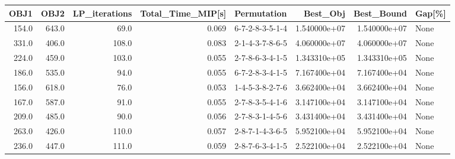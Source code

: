 \begin{tabular}{rrrrlrrl}
\toprule
  OBJ1 &   OBJ2 &  LP\_iterations &  Total\_Time\_MIP[s] &      Permutation &      Best\_Obj &    Best\_Bound & Gap[\%] \\
\midrule
 154.0 &  643.0 &           69.0 &              0.069 &  6-7-2-8-3-5-1-4 &  1.540000e+07 &  1.540000e+07 &   None \\
 331.0 &  406.0 &          108.0 &              0.083 &  2-1-4-3-7-8-6-5 &  4.060000e+07 &  4.060000e+07 &   None \\
 224.0 &  459.0 &          103.0 &              0.055 &  2-7-8-6-3-4-1-5 &  1.343310e+05 &  1.343310e+05 &   None \\
 186.0 &  535.0 &           94.0 &              0.055 &  6-7-2-8-3-4-1-5 &  7.167400e+04 &  7.167400e+04 &   None \\
 156.0 &  618.0 &           76.0 &              0.053 &  1-4-5-3-8-2-7-6 &  3.662400e+04 &  3.662400e+04 &   None \\
 167.0 &  587.0 &           91.0 &              0.055 &  2-7-8-3-5-4-1-6 &  3.147100e+04 &  3.147100e+04 &   None \\
 209.0 &  485.0 &           90.0 &              0.056 &  2-7-8-3-1-4-5-6 &  3.431400e+04 &  3.431400e+04 &   None \\
 263.0 &  426.0 &          110.0 &              0.057 &  2-8-7-1-4-3-6-5 &  5.952100e+04 &  5.952100e+04 &   None \\
 236.0 &  447.0 &          111.0 &              0.059 &  2-8-7-6-3-4-1-5 &  2.522100e+04 &  2.522100e+04 &   None \\
\bottomrule
\end{tabular}
